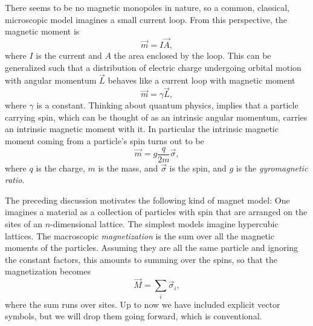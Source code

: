 There seems to be no magnetic monopoles in nature, so a common, classical,
microscopic model imagines a small current loop. From this perspective, the
magnetic moment is 
\begin{equation}
\vec m=I\vec{A},
\end{equation}
where $I$ is the current and $A$ the area enclosed by the loop.
This can be generalized such that a distribution of electric charge undergoing
orbital motion with angular momentum $\vec L$ behaves like a current loop with
magnetic moment
\begin{equation}\label{eq:magneticmomentL}
\vec m=\gamma\vec L,
\end{equation}
where $\gamma$ is a constant.
Thinking about quantum physics,  implies that a
particle carrying spin, which can be thought of as an intrinsic angular
momentum, carries an intrinsic magnetic moment with it. 
In particular the intrinsic magnetic moment coming from a particle's spin turns
out to be
\begin{equation}\label{eq:magneticmomentS}
\vec m = g\frac{q}{2m}\vec\sigma,
\end{equation}
where $q$ is the charge, $m$ is the mass, and $\vec \sigma$ is the spin, and $g$
is the {\it gyromagnetic ratio}.

The preceding discussion motivates the following kind of magnet model: One
imagines a material as a collection of particles with spin that are 
arranged on the sites of an 
$n$-dimensional lattice. The simplest models imagine hypercubic lattices.
The macroscopic {\it magnetization} is the sum over all 
the magnetic moments of the particles. Assuming they are all the same particle
and ignoring the constant factors, this amounts to summing over the spins, so that 
the magnetization becomes
\begin{equation}
\vec{M}=\sum_i\vec\sigma_i,
\end{equation}
where the sum runs over sites. Up to now we have included explicit vector
symbols, but we will drop them going forward, which is conventional. 

